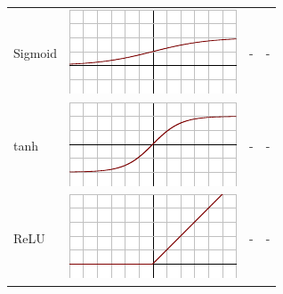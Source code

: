 \begin{tabular}{| p{25mm} | c | l | l |}
Sigmoid & \begin{minipage}{.2\textwidth}
      \includegraphics[width=\textwidth]{tex/images/activation/sigmoid}
    \end{minipage} & - & - \\

tanh & \begin{minipage}{.2\textwidth}
      \includegraphics[width=\textwidth]{tex/images/activation/tanh}
    \end{minipage} & - & - \\
    
ReLU & \begin{minipage}{.2\textwidth}
      \includegraphics[width=\textwidth]{tex/images/activation/relu}
    \end{minipage} & - & - \\
    

\end{tabular}
